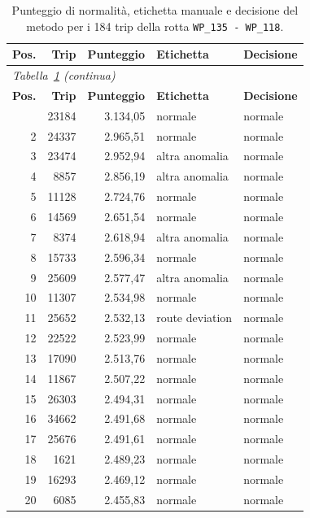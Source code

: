{\small
\renewcommand{\arraystretch}{0.8}
\begin{longtable}{rrrll}
\caption[Punteggio di normalità, etichetta manuale e decisione del metodo per i 184 trip della
rotta \texttt{WP\_135 - WP\_118}.]{Punteggio di normalità, etichetta manuale e decisione del metodo per i 184 trip della
rotta \mbox{\texttt{WP\_135 - WP\_118}}.}\label{tab:app_trips} \\
\toprule
\textbf{Pos.} & \textbf{Trip} & \textbf{Punteggio} & \textbf{Etichetta} & \textbf{Decisione} \\
\midrule
\endfirsthead
\multicolumn{5}{l}{\itshape Tabella~\ref{tab:app_trips} (continua)} \\
\toprule
\textbf{Pos.} & \textbf{Trip} & \textbf{Punteggio} & \textbf{Etichetta} & \textbf{Decisione} \\
\midrule
\endhead
\bottomrule
\endfoot
\bottomrule
\endlastfoot
1 & 23184 & 3.134,05 & normale & normale \\
2 & 24337 & 2.965,51 & normale & normale \\
3 & 23474 & 2.952,94 & altra anomalia & normale \\
4 & 8857 & 2.856,19 & altra anomalia & normale \\
5 & 11128 & 2.724,76 & normale & normale \\
6 & 14569 & 2.651,54 & normale & normale \\
7 & 8374 & 2.618,94 & altra anomalia & normale \\
8 & 15733 & 2.596,34 & normale & normale \\
9 & 25609 & 2.577,47 & altra anomalia & normale \\
10 & 11307 & 2.534,98 & normale & normale \\
11 & 25652 & 2.532,13 & route deviation & normale \\
12 & 22522 & 2.523,99 & normale & normale \\
13 & 17090 & 2.513,76 & normale & normale \\
14 & 11867 & 2.507,22 & normale & normale \\
15 & 26303 & 2.494,31 & normale & normale \\
16 & 34662 & 2.491,68 & normale & normale \\
17 & 25676 & 2.491,61 & normale & normale \\
18 & 1621 & 2.489,23 & normale & normale \\
19 & 16293 & 2.469,12 & normale & normale \\
20 & 6085 & 2.455,83 & normale & normale \\

\end{longtable}}
